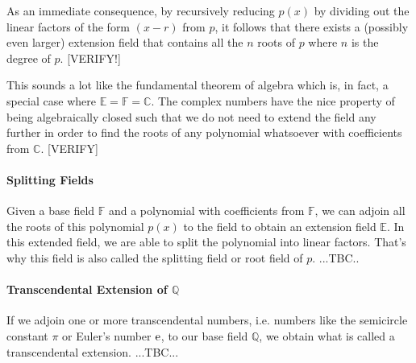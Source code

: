 \medskip
As an immediate consequence, by recursively reducing $p(x)$ by dividing out the linear factors of the form $(x-r)$ from $p$, it follows that there exists a (possibly even larger) extension field that contains all the $n$ roots of $p$ where $n$ is the degree of $p$. [VERIFY!]

\medskip
This sounds a lot like the fundamental theorem of algebra which is, in fact, a special case where  $\mathbb{E} = \mathbb{F} = \mathbb{C}$. The complex numbers have the nice property of being algebraically closed such that we do not need to extend the field any further in order to find the roots of any polynomial whatsoever with coefficients from $\mathbb{C}$. [VERIFY]

\paragraph{Splitting Fields}
Given a base field $\mathbb{F}$ and a polynomial with coefficients from $\mathbb{F}$, we can adjoin all the roots of this polynomial $p(x)$ to the field to obtain an extension field $\mathbb{E}$. In this extended field, we are able to split the polynomial into linear factors. That's why this field is also called the splitting field or root field of $p$. ...TBC.. 




\paragraph{Transcendental Extension of $\mathbb{Q}$}
If we adjoin one or more transcendental numbers, i.e. numbers like the semicircle constant $\pi$ or Euler's number $\operatorname{\mathrm{e}}$, to our base field $\mathbb{Q}$, we obtain what is called a transcendental extension. ...TBC...








